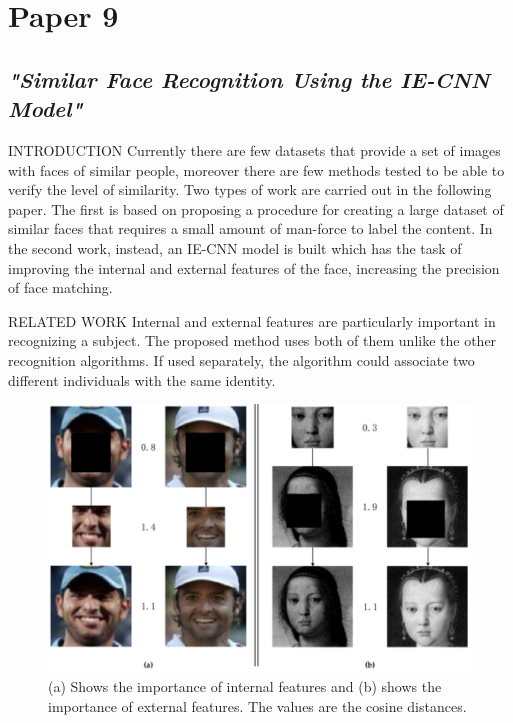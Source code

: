 \section{Paper 9}
\subsection{\emph{"Similar Face Recognition Using the IE-CNN Model"}}

\begin{frame}{INTRODUCTION}
    Currently there are few datasets that provide a set of images with faces of 
    similar people, moreover there are few methods tested to be able to verify 
    the level of similarity. Two types of work are carried out in the following paper. 
    The first is based on proposing a procedure for creating a large dataset of 
    similar faces that requires a small amount of man-force to label the content. 
    In the second work, instead, an IE-CNN model is built which has the task 
    of improving the internal and external features of the face, increasing the 
    precision of face matching.
\end{frame}

\begin{frame}{RELATED WORK}
    Internal and external features are particularly important in recognizing a 
    subject. The proposed method uses both of them unlike the other 
    recognition algorithms. If used separately, the algorithm could associate 
    two different individuals with the same identity.
    \begin{figure}[h!]
        \centering
        \includegraphics[width = 0.6\linewidth]{images/paper9/importance.png}
        \centering
        \caption{(a) Shows the importance of internal features and (b) shows the importance of external features. The values are the cosine distances.}
        \label{fig:features}
    \end{figure} 
\end{frame}

